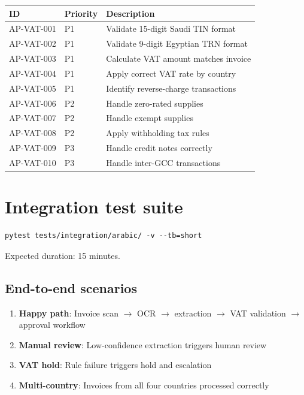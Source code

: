 \documentclass[11pt,a4paper,twoside]{report}
\begin{document}
\begin{tabularx}{\linewidth}{@{}l l X@{}}
\toprule
\textbf{ID} & \textbf{Priority} & \textbf{Description} \\ \midrule
AP-VAT-001 & P1 & Validate 15-digit Saudi TIN format \\
AP-VAT-002 & P1 & Validate 9-digit Egyptian TRN format \\
AP-VAT-003 & P1 & Calculate VAT amount matches invoice \\
AP-VAT-004 & P1 & Apply correct VAT rate by country \\
AP-VAT-005 & P1 & Identify reverse-charge transactions \\
AP-VAT-006 & P2 & Handle zero-rated supplies \\
AP-VAT-007 & P2 & Handle exempt supplies \\
AP-VAT-008 & P2 & Apply withholding tax rules \\
AP-VAT-009 & P3 & Handle credit notes correctly \\
AP-VAT-010 & P3 & Handle inter-GCC transactions \\
\bottomrule
\end{tabularx}

\section{Integration test suite}

\begin{lstlisting}[basicstyle=\ttfamily\small]
pytest tests/integration/arabic/ -v --tb=short
\end{lstlisting}

Expected duration: 15 minutes.

\subsection{End-to-end scenarios}

\begin{enumerate}
\item \textbf{Happy path}: Invoice scan $\rightarrow$ OCR $\rightarrow$ extraction
$\rightarrow$ VAT validation $\rightarrow$ approval workflow
\item \textbf{Manual review}: Low-confidence extraction triggers human review
\item \textbf{VAT hold}: Rule failure triggers hold and escalation
\item \textbf{Multi-country}: Invoices from all four countries processed correctly
\end{enumerate}
\end{document}
